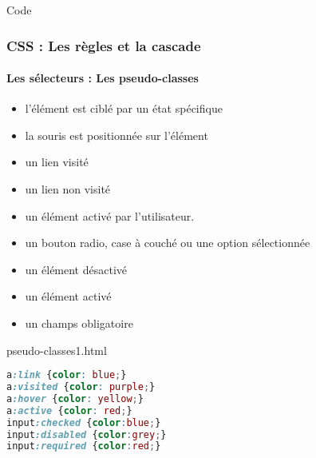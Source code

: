 \documentclass[xcolor=table]{beamer}
\begin{document}
\begin{frame}[fragile]{Code}
\frametitle{CSS : Les règles et la cascade}
\framesubtitle{Les sélecteurs : Les pseudo-classes}

\begin{minipage}{0.60\textwidth} 
	\begin{itemize}
		\item l'élément est ciblé par un état spécifique
		\item {} la souris est positionnée sur l'élément
		\item {} un lien visité
		\item {} un lien non visité
		\item {} un élément activé par l'utilisateur.
		\item {} un bouton radio, case à couché ou une option sélectionnée
		\item {} un élément désactivé
		\item {} un élément activé
		\item {} un champs obligatoire
	\end{itemize}
\end{minipage}
%
\begin{minipage}{0.38\textwidth}
\begin{block}{pseudo-classes1.html}
\scriptsize\bfseries
\begin{lstlisting}[language={CSS}]
a:link {color: blue;}
a:visited {color: purple;}
a:hover {color: yellow;}
a:active {color: red;}
input:checked {color:blue;}
input:disabled {color:grey;}
input:required {color:red;}
\end{lstlisting}
\end{block}
\end{minipage}

\end{frame}
\end{document}

